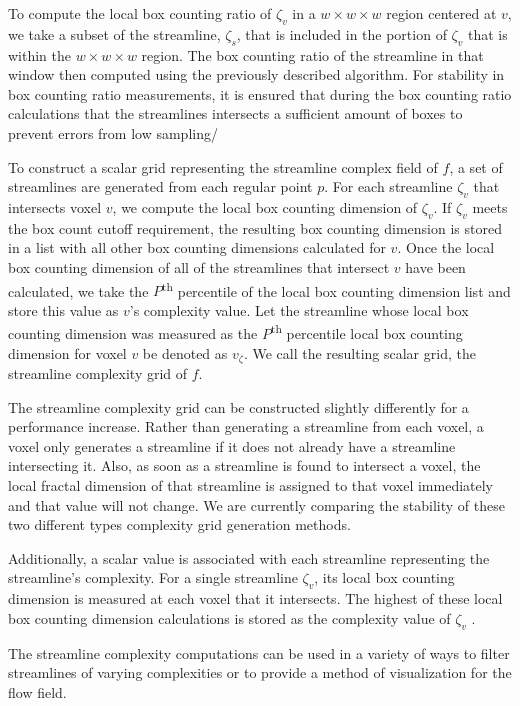 \documentclass{egpubl}
\newcommand {\emath}[1]  {\ensuremath{#1}}
\newcommand {\gDim}[1]   {\emath{#1 \times #1 \times #1}} %
\begin{document}
To compute the local box counting ratio of $\zeta_v$ in a $\gDim{w}$ region centered at $v$, we take a subset of the streamline, $\zeta_s$, that is included in the portion of $\zeta_v$ that is within the $\gDim{w}$ region.
The box counting ratio of the streamline in that window then computed using the previously described algorithm.
For stability in box counting ratio measurements, it is ensured that during the box counting ratio calculations that the streamlines intersects a sufficient amount of boxes to prevent errors from low sampling/

To construct a scalar grid representing the streamline complex field of $f$, a set of streamlines are generated from each regular point $p$.
For each streamline $\zeta_v$ that intersects voxel $v$, we compute the local box counting dimension of $\zeta_v$.
If $\zeta_v$ meets the box count cutoff requirement, the resulting box counting dimension is stored in a list with all other box counting dimensions calculated for $v$.
Once the local box counting dimension of all of the streamlines that intersect $v$ have been calculated, we take the $P$\textsuperscript{th} percentile of the local box counting dimension list and store this value as $v$'s complexity value.
Let the streamline whose local box counting dimension was measured as the $P$\textsuperscript{th} percentile local box counting dimension for voxel $v$ be denoted as $v_\zeta$.
We call the resulting scalar grid, the streamline complexity grid of $f$.

The streamline complexity grid can be constructed slightly differently for a performance increase.
Rather than generating a streamline from each voxel, a voxel only generates a streamline if it does not already have a streamline intersecting it.
Also, as soon as a streamline is found to intersect a voxel, the local fractal dimension of that streamline is assigned to that voxel immediately and that value will not change.
We are currently comparing the stability of these two different types complexity grid generation methods.

Additionally, a scalar value is associated with each streamline representing the streamline's complexity.
For a single streamline $\zeta_v$, its local box counting dimension is measured at each voxel that it intersects.
The highest of these local box counting dimension calculations is stored as the complexity value of $\zeta_v$ .

The streamline complexity computations can be used in a variety of ways to filter streamlines of varying complexities or to provide a method of visualization for the flow field.
\end{document}
